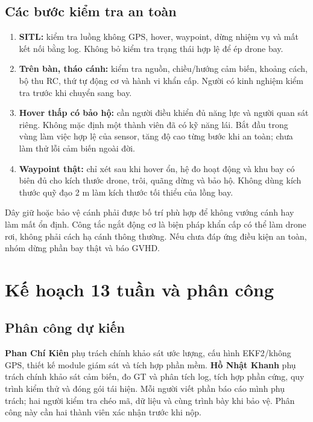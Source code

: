 \documentclass[a4paper,12pt]{article}
\begin{document}
\subsection{Các bước kiểm tra an toàn}
\begin{enumerate}
\item \textbf{SITL:} kiểm tra luồng không GPS, hover, waypoint, dừng nhiệm vụ và mất kết nối bằng log. Không bỏ kiểm tra trạng thái hợp lệ để ép drone bay.
\item \textbf{Trên bàn, tháo cánh:} kiểm tra nguồn, chiều/hướng cảm biến, khoảng cách, bộ thu RC, thứ tự động cơ và hành vi khẩn cấp. Người có kinh nghiệm kiểm tra trước khi chuyển sang bay.
\item \textbf{Hover thấp có bảo hộ:} cần người điều khiển đủ năng lực và người quan sát riêng. Không mặc định một thành viên đã có kỹ năng lái. Bắt đầu trong vùng làm việc hợp lệ của sensor, tăng độ cao từng bước khi an toàn; chưa làm thử lỗi cảm biến ngoài đời.
\item \textbf{Waypoint thật:} chỉ xét sau khi hover ổn, hệ đo hoạt động và khu bay có biên đủ cho kích thước drone, trôi, quãng dừng và bảo hộ. Không dùng kích thước quỹ đạo 2 m làm kích thước tối thiểu của lồng bay.
\end{enumerate}
Dây giữ hoặc bảo vệ cánh phải được bố trí phù hợp để không vướng cánh hay làm mất ổn định. Công tắc ngắt động cơ là biện pháp khẩn cấp có thể làm drone rơi, không phải cách hạ cánh thông thường. Nếu chưa đáp ứng điều kiện an toàn, nhóm dừng phần bay thật và báo GVHD.

\section{Kế hoạch 13 tuần và phân công}
\subsection{Phân công dự kiến}
\textbf{Phan Chí Kiên} phụ trách chính khảo sát ước lượng, cấu hình EKF2/không GPS, thiết kế module giám sát và tích hợp phần mềm. \textbf{Hồ Nhật Khanh} phụ trách chính khảo sát cảm biến, đo GT và phân tích log, tích hợp phần cứng, quy trình kiểm thử và đóng gói tái hiện. Mỗi người viết phần báo cáo mình phụ trách; hai người kiểm tra chéo mã, dữ liệu và cùng trình bày khi bảo vệ. Phân công này cần hai thành viên xác nhận trước khi nộp.
\end{document}
